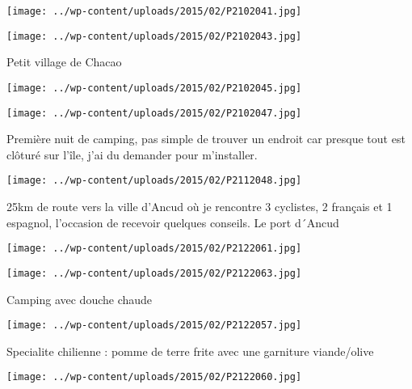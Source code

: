 \newline
\centerline{\texttt{[image: ../wp-content/uploads/2015/02/P2102041.jpg]} } 
\newline
\centerline{\texttt{[image: ../wp-content/uploads/2015/02/P2102043.jpg]} } 
 \newline
 Petit village de Chacao \newline
 \newline
\centerline{\texttt{[image: ../wp-content/uploads/2015/02/P2102045.jpg]} } 
\newline
\centerline{\texttt{[image: ../wp-content/uploads/2015/02/P2102047.jpg]} } 
 \newline
 Première nuit de camping, pas simple de trouver un endroit car presque tout est clôturé sur l'île, j'ai du demander pour m'installer. \newline
 \newline
\centerline{\texttt{[image: ../wp-content/uploads/2015/02/P2112048.jpg]} } 
 25km de route vers la ville d'Ancud où je rencontre 3 cyclistes, 2 français et 1 espagnol, l'occasion de recevoir quelques conseils. \newline
 Le port d´Ancud \newline
 \newline
\centerline{\texttt{[image: ../wp-content/uploads/2015/02/P2122061.jpg]} } 
\newline
\centerline{\texttt{[image: ../wp-content/uploads/2015/02/P2122063.jpg]} } 
 \newline
 Camping avec douche chaude\newline
\centerline{\texttt{[image: ../wp-content/uploads/2015/02/P2122057.jpg]} } 
Specialite chilienne : pomme de terre frite avec une garniture viande/olive\newline
\centerline{\texttt{[image: ../wp-content/uploads/2015/02/P2122060.jpg]} } 
 \newline

\newpage
 
